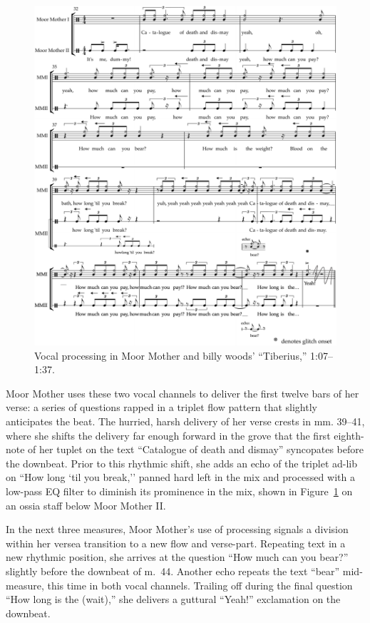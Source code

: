 \begin{figure}[!p]
    \centering
    \includegraphics[width=\textwidth]{images/figures/chp 03/107136tiberiusprocessing.pdf}
    \caption{Vocal processing in Moor Mother and billy woods' ``Tiberius,'' 1:07--1:37.}
    \label{fig:moormotherprocess}
\end{figure}

Moor Mother uses these two vocal channels to deliver the first twelve bars of her verse: a series of questions rapped
in a triplet flow pattern that slightly anticipates the beat. The hurried, harsh delivery of her verse crests in mm. 
39--41, where she shifts the delivery far enough forward in the grove that the first eighth-note of her tuplet on the
text ``Catalogue of death and dismay'' syncopates before the downbeat. Prior to this rhythmic shift, she adds an echo
of the triplet ad-lib on ``How long `til you break,'' panned hard left in the mix and processed with a low-pass EQ
filter to diminish its prominence in the mix, shown in Figure~\ref{fig:moormotherprocess} on an ossia staff below Moor
Mother II.

In the next three measures, Moor Mother's use of processing signals a division within her verse\textemdash a transition
to a new flow and verse-part. Repeating text in a new rhythmic position, she arrives at the question ``How much can you 
bear?'' slightly before the downbeat of m.~44. Another echo repeats the text ``bear'' mid-measure, this time in both vocal
channels. Trailing off during the final question ``How long is the (wait),'' she delivers a guttural ``Yeah!'' exclamation
on the downbeat.

